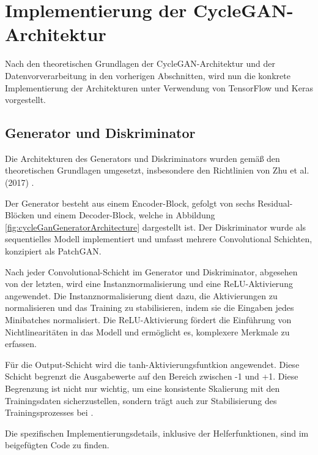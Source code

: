 \section{Implementierung der CycleGAN-Architektur}
Nach den theoretischen Grundlagen der CycleGAN-Architektur und der Datenvorverarbeitung in den vorherigen Abschnitten, wird nun die konkrete Implementierung der Architekturen unter Verwendung von TensorFlow und Keras vorgestellt.

\subsection{Generator und Diskriminator}
Die Architekturen des Generators und Diskriminators wurden gemäß den theoretischen Grundlagen umgesetzt, insbesondere den Richtlinien von Zhu et al. (2017) \cite{Zhu.2017}. 

Der Generator besteht aus einem Encoder-Block, gefolgt von sechs Residual-Blöcken und einem Decoder-Block, welche in Abbildung \ref{fig:cycleGanGeneratorArchitecture} dargestellt ist.
Der Diskriminator wurde als sequentielles Modell implementiert und umfasst mehrere Convolutional Schichten, konzipiert als PatchGAN.

Nach jeder Convolutional-Schicht im Generator und Diskriminator, abgesehen von der letzten, wird eine Instanznormalisierung und eine ReLU-Aktivierung angewendet. 
Die Instanznormalisierung dient dazu, die Aktivierungen zu normalisieren und das Training zu stabilisieren, indem sie die Eingaben jedes Minibatches normalisiert. Die ReLU-Aktivierung fördert die Einführung von Nichtlinearitäten in das Modell und ermöglicht es, komplexere Merkmale zu erfassen.

Für die Output-Schicht wird die tanh-Aktivierungsfuntkion angewendet. Diese Schicht begrenzt die Ausgabewerte auf den Bereich zwischen -1 und +1. Diese Begrenzung ist nicht nur wichtig, um eine konsistente Skalierung mit den Trainingsdaten sicherzustellen, sondern trägt auch zur Stabilisierung des Trainingsprozesses bei \cite{Radford.2015}.

Die spezifischen Implementierungsdetails, inklusive der Helferfunktionen, sind im beigefügten Code zu finden.






